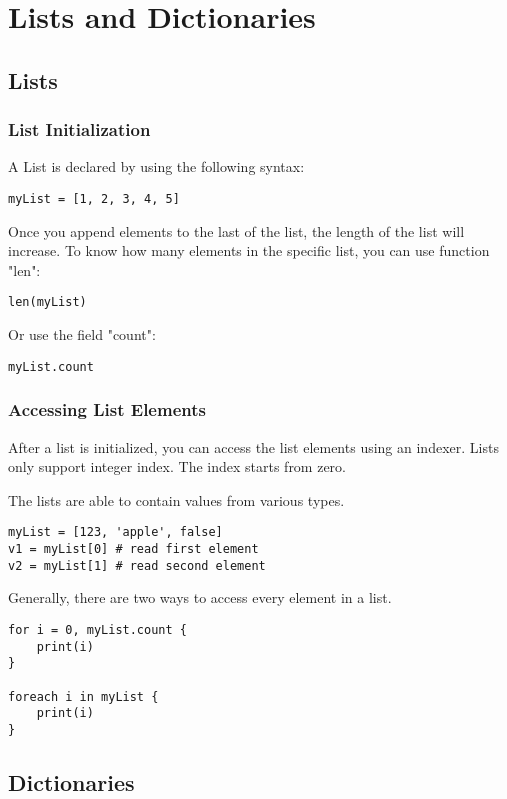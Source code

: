 \chapter{Lists and Dictionaries}
\section{Lists}
\subsection{List Initialization}
A List is declared by using the following syntax:
\begin{lstlisting}
myList = [1, 2, 3, 4, 5]
\end{lstlisting}
Once you append elements to the last of the list, the length of the list will increase. To know how many elements in the specific list, you can use function "len":
\begin{lstlisting}
len(myList)
\end{lstlisting}
Or use the field "count":
\begin{lstlisting}
myList.count
\end{lstlisting}

\subsection{Accessing List Elements}
After a list is initialized, you can access the list elements using an indexer. Lists only support integer index. The index starts from zero.

The lists are able to contain values from various types.
\begin{lstlisting}
myList = [123, 'apple', false]
v1 = myList[0] # read first element
v2 = myList[1] # read second element
\end{lstlisting}

Generally, there are two ways to access every element in a list.

\begin{lstlisting}
for i = 0, myList.count {
	print(i)
}

foreach i in myList {
	print(i)
}
\end{lstlisting}

\section{Dictionaries}
